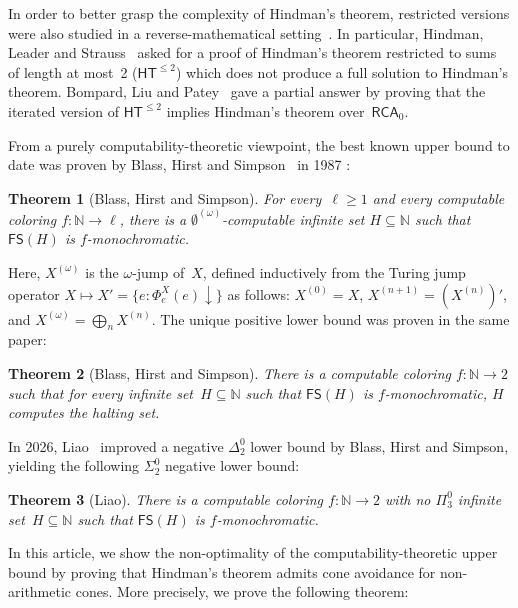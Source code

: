 \documentclass{article}
\newcommand{\RCA}[0]{\mathsf{RCA}}
\newcommand{\HT}[0]{\mathsf{HT}}
\newcommand{\NN}[0]{\mathbb{N}}
\newcommand{\FS}[0]{\mathsf{FS}} %
\newtheorem{theorem}{Theorem}
\numberwithin{theorem}{section}
\begin{document}
In order to better grasp the complexity of Hindman's theorem, restricted versions were also studied in a reverse-mathematical setting~\cite{carlucciWeakStrongRestrictions2016,carlucciWeakVariantHindman2017,carlucci2020new,dzhafarovEffectivenessHindmanTheorem2017}. In particular, Hindman, Leader and Strauss~\cite{hindman2003open} asked for a proof of Hindman's theorem restricted to sums of length at most~2 ($\HT^{\leq 2}$) which does not produce a full solution to Hindman's theorem. Bompard, Liu and Patey~\cite{bompardReverseMathematicsCarlson2022} gave a partial answer by proving that the iterated version of $\HT^{\leq 2}$ implies Hindman's theorem over~$\RCA_0$.

From a purely computability-theoretic viewpoint, the best known upper bound to date was proven by Blass, Hirst and Simpson~\cite{blassLogicalAnalysisTheorems1987} in 1987 :

\begin{theorem}[Blass, Hirst and Simpson]
For every~$\ell \geq 1$ and every computable coloring $f : \NN \to \ell$, there is a $\emptyset^{(\omega)}$-computable infinite set $H \subseteq \NN$ such that $\FS(H)$ is $f$-monochromatic.
\end{theorem}

Here, $X^{(\omega)}$ is the $\omega$-jump of~$X$, defined inductively from the Turing jump operator $X \mapsto X' = \{ e : \Phi^X_e(e)\downarrow \}$ as follows: $X^{(0)} = X$, $X^{(n+1)} = (X^{(n)})'$, and $X^{(\omega)} = \bigoplus_n X^{(n)}$. The unique positive lower bound was proven in the same paper:

\begin{theorem}[Blass, Hirst and Simpson]
There is a computable coloring $f : \NN \to 2$ such that for every infinite set~$H \subseteq \NN$ 
such that $\FS(H)$ is $f$-monochromatic, $H$ computes the halting set.
\end{theorem}

In 2026, Liao~\cite{liao2026recursive} improved a negative $\Delta^0_2$ lower bound by Blass, Hirst and Simpson, yielding the following $\Sigma^0_2$ negative lower bound:

\begin{theorem}[Liao]
There is a computable coloring $f : \NN \to 2$ with no $\Pi^0_3$ infinite set~$H \subseteq \NN$ such that $\FS(H)$ is $f$-monochromatic.
\end{theorem}

In this article, we show the non-optimality of the computability-theoretic upper bound by proving that Hindman's theorem admits cone avoidance for non-arithmetic cones. More precisely, we prove the following theorem:
\end{document}

